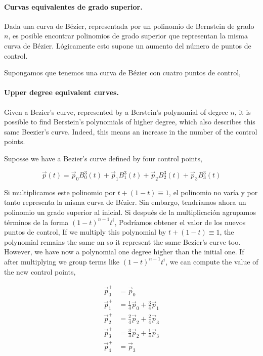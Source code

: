 \begin{paracol}{2}
\paragraph{Curvas equivalentes de grado superior.} Dada una curva de Bézier, representada por un polinomio de Bernstein de grado $n$, es posible encontrar polinomios de grado superior que representan la misma curva de Bézier. Lógicamente esto supone un aumento del número de puntos de control.

Supongamos que tenemos una curva de Bé\-zier con cuatro puntos de control,

\switchcolumn
\paragraph{Upper degree equivalent curves.} Given a Bezier's curve, represented by a Berstein's polynomial of degree $n$, it is possible to find Berstein's polynomials of higher degree, which also describes this same Beezier's curve. Indeed, this means an increase in the number of the control points.

Suposse we have a Bezier's curve defined by four control points,
\end{paracol}
\begin{equation*}
\vec{p}(t) = \vec{p}_0B_0^3(t) + \vec{p}_1B_1^3(t) + \vec{p}_2B_2^3(t) + \vec{p}_3B_3^3(t)
\end{equation*}
\begin{paracol}{2}
Si multiplicamos este polinomio por $ t + (1 -t) \equiv 1$, el polinomio no varía y por tanto representa la misma curva de Bézier. Sin embargo, tendríamos ahora un polinomio un grado superior al inicial.  Si después de la multiplicación agrupamos términos de la forma $(1-t)^{n-1}t^i$, Podríamos obtener el valor de los nuevos puntos de control,
\switchcolumn
If we multiply this polynomial by $ t + (1 -t) \equiv 1$, the polynomial remains the same an so it represent the same Bezier's curve too. However, we have now a polynomial one degree higher than the initial one. If after multiplying we group terms like $(1-t)^{n-1}t^i$, we can compute the value of the new control points,
\end{paracol}
\begin{align*}
\vec{p}_0^+&= \vec{p}_0\\
\vec{p}_1^+&= \frac{1}{4}\vec{p}_0 + \frac{3}{4}\vec{p}_1\\
\vec{p}_2^+&= \frac{2}{4}\vec{p}_2 + \frac{2}{4}\vec{p}_3\\
\vec{p}_3^+&= \frac{3}{4}\vec{p}_2 + \frac{1}{4}\vec{p}_3\\
\vec{p}_4^+&= \vec{p}_3\\
\end{align*}
